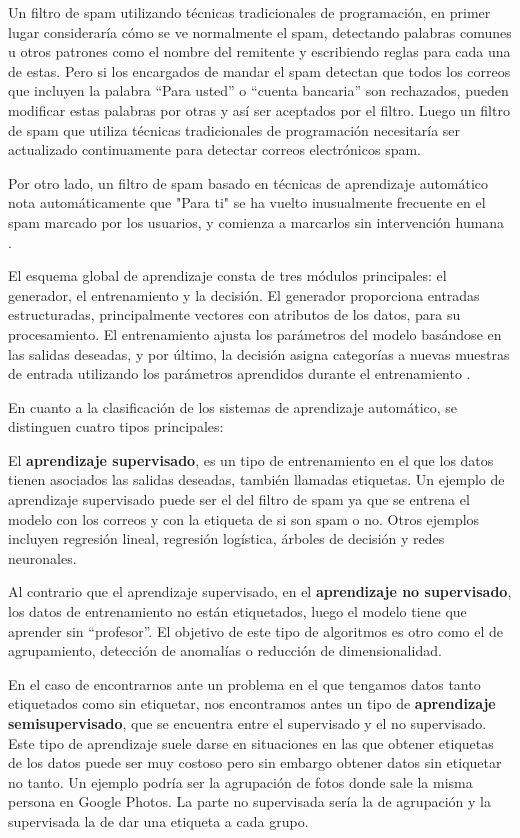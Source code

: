 Un filtro de spam utilizando técnicas tradicionales de programación, en primer lugar consideraría cómo se ve normalmente el spam, detectando palabras comunes u otros patrones como el nombre del remitente y escribiendo reglas para cada una de estas. Pero si los encargados de mandar el spam detectan que todos los correos que incluyen la palabra ``Para usted'' o  ``cuenta bancaria'' son rechazados, pueden modificar estas palabras por otras y así ser aceptados por el filtro. Luego un filtro de spam que utiliza técnicas tradicionales de programación necesitaría ser actualizado continuamente para detectar correos electrónicos spam. 

Por otro lado, un filtro de spam basado en técnicas de aprendizaje automático nota automáticamente que "Para ti" se ha vuelto inusualmente frecuente en el spam marcado por los usuarios, y comienza a marcarlos sin intervención humana \citep{geron2022hands}.


\bigskip

El esquema global de aprendizaje consta de tres módulos principales: el generador, el entrenamiento y la decisión. El generador proporciona entradas estructuradas, principalmente vectores con atributos de los datos, para su procesamiento. El entrenamiento ajusta los parámetros del modelo basándose en las salidas deseadas, y por último, la decisión asigna categorías a nuevas muestras de entrada utilizando los parámetros aprendidos durante el entrenamiento \citep{pajares2021aprendizaje}.



En cuanto a la clasificación de los sistemas de aprendizaje automático, se distinguen cuatro tipos principales:

El \textbf{aprendizaje supervisado}, es un tipo de entrenamiento en el que los datos tienen asociados las salidas deseadas, también llamadas etiquetas. Un ejemplo de aprendizaje supervisado puede ser el del filtro de spam ya que se entrena el modelo con los correos y con la etiqueta de si son spam o no. Otros ejemplos incluyen regresión lineal, regresión logística, árboles de decisión y redes neuronales.


Al contrario que el aprendizaje supervisado, en el \textbf{aprendizaje no supervisado}, los datos de entrenamiento no están etiquetados, luego el modelo tiene que aprender sin ``profesor''. El objetivo de este tipo de algoritmos es otro como el de agrupamiento, detección de anomalías o reducción de dimensionalidad. 


En el caso de encontrarnos ante un problema en el que tengamos datos tanto etiquetados como sin etiquetar, nos encontramos antes un tipo de \textbf{aprendizaje semisupervisado}, que se encuentra entre el supervisado y el no supervisado. Este tipo de aprendizaje suele darse en situaciones en las que obtener etiquetas de los datos puede ser muy costoso pero sin embargo obtener datos sin etiquetar no tanto. Un ejemplo podría ser la agrupación de fotos donde sale la misma persona en Google Photos. La parte no supervisada sería la de agrupación y la supervisada la de dar una etiqueta a cada grupo.


